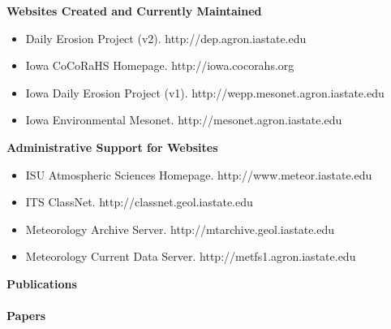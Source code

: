 %
\Large \bf Websites Created and Currently Maintained
\normalsize \sf
\begin{itemize}
\item Daily Erosion Project (v2). http://dep.agron.iastate.edu
\item Iowa CoCoRaHS Homepage. http://iowa.cocorahs.org
\item Iowa Daily Erosion Project (v1). http://wepp.mesonet.agron.iastate.edu
\item Iowa Environmental Mesonet. http://mesonet.agron.iastate.edu
\end{itemize}
\Large \bf Administrative Support for Websites
\normalsize \sf
\begin{itemize}
\item ISU Atmospheric Sciences Homepage. http://www.meteor.iastate.edu
\item ITS ClassNet. http://classnet.geol.iastate.edu
\item Meteorology Archive Server. http://mtarchive.geol.iastate.edu
\item Meteorology Current Data Server. http://metfs1.agron.iastate.edu
\end{itemize}
%
\Large \bf Publications\\ \\
\normalsize \bf Papers
\normalsize \sf
